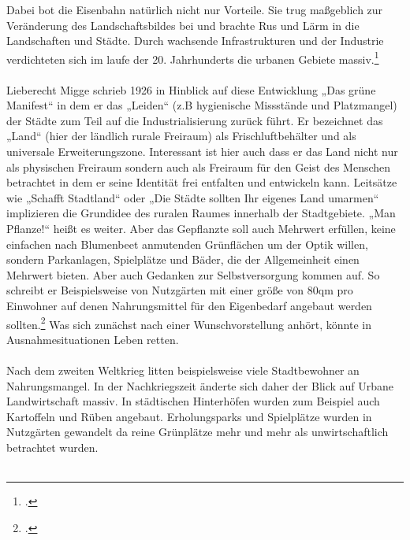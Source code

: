 \documentclass{scrartcl}
\begin{document}
Dabei bot die Eisenbahn natürlich nicht nur Vorteile. Sie trug maßgeblich zur Veränderung des Landschaftsbildes bei und brachte Rus und Lärm in die Landschaften und Städte. Durch wachsende Infrastrukturen und der Industrie verdichteten sich im laufe der 20. Jahrhunderts die urbanen Gebiete massiv.\footcite[Vgl.][S. 57]{Schafers2016SozialgeschichteSoziologie}\\
\\
Lieberecht Migge schrieb 1926 in Hinblick auf diese Entwicklung „Das grüne Manifest“ in dem er das „Leiden“ (z.B hygienische Missstände und Platzmangel) der Städte zum Teil auf die Industrialisierung zurück führt. Er bezeichnet das „Land“ (hier der ländlich rurale Freiraum) als Frischluftbehälter und als universale Erweiterungszone. Interessant ist hier auch dass er das Land nicht nur als physischen Freiraum sondern auch als Freiraum für den Geist des Menschen betrachtet in dem er seine Identität frei entfalten und entwickeln kann. Leitsätze wie „Schafft Stadtland“ oder „Die Städte sollten Ihr eigenes Land umarmen“ implizieren die Grundidee des ruralen Raumes innerhalb der Stadtgebiete. „Man Pflanze!“ heißt es weiter. Aber das Gepflanzte soll auch Mehrwert erfüllen, keine einfachen nach Blumenbeet anmutenden Grünflächen um der Optik willen, sondern Parkanlagen, Spielplätze und Bäder, die der Allgemeinheit einen Mehrwert bieten. Aber auch Gedanken zur Selbstversorgung kommen auf. So schreibt er Beispielsweise von Nutzgärten mit einer größe von 80qm pro Einwohner auf denen Nahrungsmittel für den Eigenbedarf angebaut werden sollten.\footcite[Vgl.][S. 7-15]{Leberecht1926DeutscheBinnenkolonisation} Was sich zunächst nach einer Wunschvorstellung anhört, könnte in Ausnahmesituationen Leben retten.\\
\\
Nach dem zweiten Weltkrieg litten beispielsweise viele Stadtbewohner an Nahrungsmangel. In der Nachkriegszeit änderte sich daher der Blick auf Urbane Landwirtschaft massiv. In städtischen Hinterhöfen wurden zum Beispiel auch Kartoffeln und Rüben angebaut. Erholungsparks und Spielplätze wurden in Nutzgärten gewandelt da reine Grünplätze mehr und mehr als unwirtschaftlich betrachtet wurden. \\
\\
\end{document}
